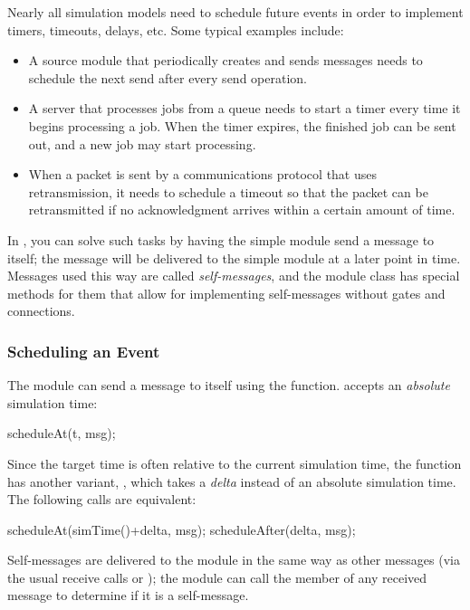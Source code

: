 Nearly all simulation models need to schedule future events in order
to implement timers, timeouts, delays, etc. Some typical examples include:

\begin{itemize}
  \item A source module that periodically creates and sends messages
    needs to schedule the next send after every send operation.
  \item A server that processes jobs from a queue needs to start
    a timer every time it begins processing a job. When the timer
    expires, the finished job can be sent out, and a new job may
    start processing.
  \item When a packet is sent by a communications protocol that uses
    retransmission, it needs to schedule a timeout so that the packet
    can be retransmitted if no acknowledgment arrives within a certain
    amount of time.
\end{itemize}

In {\opp}, you can solve such tasks by having the simple module send a message
to itself; the message will be delivered to the simple module at a later
point in time. Messages used this way are called
\textit{self-messages}, and the module class has special methods for them
that allow for implementing self-messages without gates and connections.

\subsubsection{Scheduling an Event}
\label{sec:simple-modules:scheduling}

The module can send a message to itself using the  function.
 accepts an \textit{absolute} simulation time:

\begin{cpp}
scheduleAt(t, msg);
\end{cpp}

Since the target time is often relative to the current simulation time,
the function has another variant, , which takes
a \textit{delta} instead of an absolute simulation time. The following
calls are equivalent:

\begin{cpp}
scheduleAt(simTime()+delta, msg);
scheduleAfter(delta, msg);
\end{cpp}

Self-messages are delivered to the module in the same way as other
messages (via the usual receive calls or );
the module can call the  member of any received
message to determine if it is a self-message.

